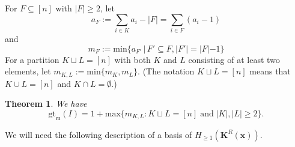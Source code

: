 \documentclass[10pt,reqno]{amsart}
\newtheorem{theorem}[subsection]{Theorem}
\newtheorem{lemma}[subsection]{Lemma}
\theoremstyle{definition}
\theoremstyle{remark}
\numberwithin{equation}{section}
\newcommand{\m}{\mathfrak m}
\numberwithin{equation}{section}
\begin{document}
 For $F\subseteq [n]$ with $|F|\geq 2$, let \[
a_F:=\sum_{i\in K} a_i-|F|=\sum_{i\in F}(a_i-1)
\]
and \[
m_F:=\mathrm{min}\{a_{F'}\, | \, F'\subseteq F, |F'|=|F|-1\}
\]
For a partition $K\sqcup L= [n]$ with both $K$ and $L$ consisting of at least two elements, let $m_{K, L}:=\mathrm{min}\{m_K, m_L\}$.
(The notation $K\sqcup L=[n]$ means that $K\cup L=[n]$ and $K\cap L=\emptyset$.)
 \begin{theorem}\label{preciseCIbound}
     We have 
    $$
    \mathrm{gt}_{\m}(I)=1+\mathrm{max}\{m_{K, L}: K\sqcup L= [n]\;\text{and}\;|K|,|L|\geq 2 \}.
     $$
 \end{theorem}


 We will need the following description of a basis of $H_{\geq 1}(\mathbf{K}^R(\mathbf{x}))$.  
\end{document}
